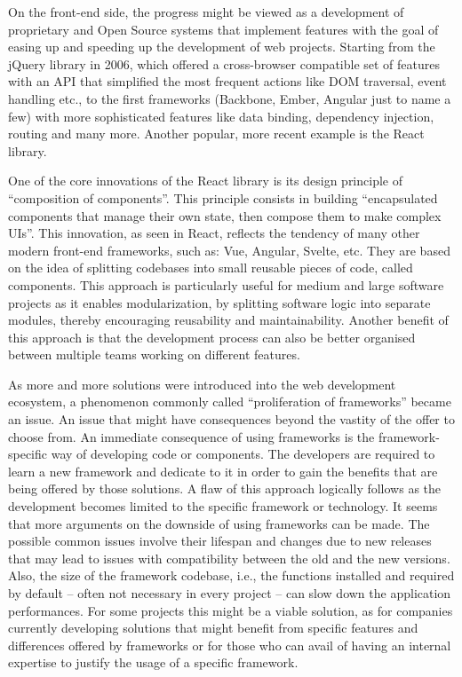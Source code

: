 On the front-end side, the progress might be viewed as a development of proprietary and Open Source systems that implement features with the goal of easing up and speeding up the development of web projects. Starting from the jQuery library in 2006, which offered a cross-browser compatible set of features with an API that simplified the most frequent actions like DOM traversal, event handling etc., to the first frameworks (Backbone, Ember, Angular just to name a few) with more sophisticated features like data binding, dependency injection, routing and many more. Another popular, more recent example is the React library.

One of the core innovations of the React library is its design principle of “composition of components”. This principle consists in building “encapsulated components that manage their own state, then compose them to make complex UIs”. This innovation, as seen in React, reflects the tendency of many other modern front-end frameworks, such as: Vue, Angular, Svelte, etc. They are based on the idea of splitting codebases into small reusable pieces of code, called components. This approach is particularly useful for medium and large software projects as it enables modularization, by splitting software logic into separate modules, thereby encouraging reusability and maintainability. Another benefit of this approach is that the development process can also be better organised between multiple teams working on different features. 

As more and more solutions were introduced into the web development ecosystem, a phenomenon commonly called “proliferation of frameworks” became an issue. An issue that might have consequences beyond the vastity of the offer to choose from.
An immediate consequence of using frameworks is the framework-specific way of developing code or components. The developers are required to learn a new framework and dedicate to it in order to gain the benefits that are being offered by those solutions. A flaw of this approach logically follows as the development becomes limited to the specific framework or technology. It seems that more arguments on the downside of using frameworks can be made. The possible common issues involve their lifespan and changes due to new releases that may lead to issues with compatibility between the old and the new versions. Also, the size of the framework codebase, i.e., the functions installed and required by default – often not necessary in every project – can slow down the application performances.
For some projects this might be a viable solution, as for companies currently developing solutions that might benefit from specific features and differences offered by frameworks or for those who can avail of having an internal expertise to justify the usage of a specific framework.

